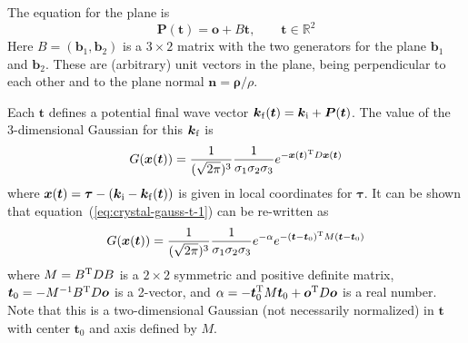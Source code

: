 The equation for the plane is
\begin{equation}
  \label{eq:crystal-tangent-plane}
    \boldsymbol{P}(\boldsymbol{t}) = \boldsymbol{o} + B \boldsymbol{t}, \qquad
    \boldsymbol{t} \in \mathbb{R}^2
\end{equation}
Here $B = (\boldsymbol{b}_1, \boldsymbol{b}_2)$ is a $3\times 2$ matrix
with the two generators for the plane $\boldsymbol{b}_1$ and
$\boldsymbol{b}_2$. These are (arbitrary) unit vectors in the plane,
being perpendicular to
each other and to the plane normal $\boldsymbol{n} =
\boldsymbol{\rho}/\rho$.

Each $\boldsymbol{t}$ defines a potential final wave vector
$\boldsymbol{k}_{\rm f}(\boldsymbol{t}) = \boldsymbol{k}_{\rm i} +
\boldsymbol{P}(\boldsymbol{t})$. The value of the 3-dimensional Gaussian
for this $\boldsymbol{k}_{\rm f}$ is
\begin{equation}
  \label{eq:crystal-gauss-t-1}
  G(\boldsymbol{x}(\boldsymbol{t})) =
  \frac{1}{(\sqrt{2\pi})^3}\frac{1}{\sigma_1\sigma_2\sigma_3}
  e^{-\boldsymbol{x}(\boldsymbol{t})^{\rm T} D \boldsymbol{x}(\boldsymbol{t})}
\end{equation}
where $\boldsymbol{x}(\boldsymbol{t}) = \boldsymbol{\tau} -
(\boldsymbol{k}_{\rm i} - \boldsymbol{k}_{\rm f}(\boldsymbol{t}))$ is
given in local coordinates for $\boldsymbol{\tau}$. It can be shown that
equation~(\ref{eq:crystal-gauss-t-1}) can be re-written as
\begin{equation}
  \label{eq:crystal-gauss-2}
  G(\boldsymbol{x}(\boldsymbol{t})) =
  \frac{1}{(\sqrt{2\pi})^3}\frac{1}{\sigma_1\sigma_2\sigma_3} e^{-\alpha}
  e^{-(\boldsymbol{t}-\boldsymbol{t}_0)^{\rm T} M
    (\boldsymbol{t}-\boldsymbol{t}_0)}
\end{equation}
where $M = B^{\rm T} D B$ is a $2 \times 2$ symmetric and positive
definite matrix, $\boldsymbol{t}_0 = -M^{-1}B^{\rm T} D \boldsymbol{o}$
is a 2-vector, and $\alpha = -\boldsymbol{t}_0^{\rm T} M
\boldsymbol{t}_0 + \boldsymbol{o}^{\rm T} D \boldsymbol{o}$ is a real
number.  Note that this is a two-dimensional Gaussian (not necessarily
normalized) in $\boldsymbol{t}$ with center $\boldsymbol{t}_0$ and axis
defined by $M$.

